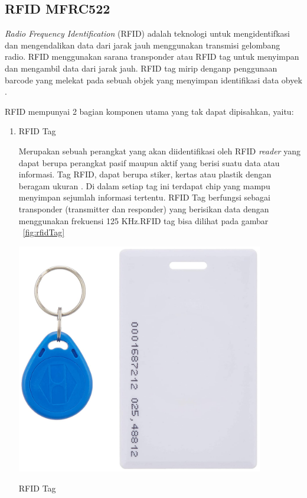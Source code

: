 \subsection{RFID MFRC522}
\textit{Radio Frequency Identification} (RFID) adalah teknologi untuk mengidentifkasi dan mengendalikan data dari jarak jauh menggunakan transmisi gelombang radio. RFID menggunakan sarana transponder atau RFID tag untuk menyimpan dan mengambil data dari jarak jauh. RFID tag mirip denganp penggunaan barcode yang melekat pada sebuah objek yang menyimpan identifikasi data obyek .

RFID mempunyai 2 bagian komponen utama yang tak dapat dipisahkan, yaitu:
\begin{enumerate}[topsep=0pt,itemsep=0pt,partopsep=0pt, parsep=0pt]
    \item RFID Tag
    
    Merupakan sebuah perangkat yang akan diidentifikasi oleh RFID \textit{reader} yang dapat berupa perangkat pasif maupun aktif yang berisi suatu data atau informasi. Tag RFID, dapat berupa stiker, kertas atau plastik dengan beragam ukuran . Di dalam setiap tag ini terdapat chip yang mampu menyimpan sejumlah informasi tertentu. RFID Tag berfungsi sebagai transponder (transmitter dan responder) yang berisikan data dengan menggunakan frekuensi 125 KHz.RFID tag bisa dilihat pada gambar ~\ref{fig:rfidTag} 

    \begin{afigure} 
        \includegraphics[width=0.85\textwidth, center]{images/rfidTag.jpg}
        \caption{RFID Tag}
        \label{fig:rfidTag}
    \end{afigure}


\end{enumerate}

